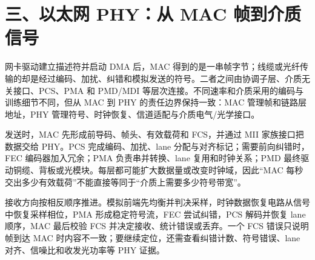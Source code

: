 \section{三、以太网 PHY：从 MAC 帧到介质信号}

网卡驱动建立描述符并启动 DMA 后，MAC 得到的是一串帧字节；线缆或光纤传输的却是经过编码、加扰、纠错和模拟发送的符号。二者之间由协调子层、介质无关接口、PCS、PMA 和 PMD/MDI 等层次连接。不同速率和介质采用的编码与训练细节不同，但从 MAC 到 PHY 的责任边界保持一致：MAC 管理帧和链路层地址，PHY 管理符号、时钟恢复、信道适配与介质电气/光学接口。\cite{ieee8023-baselines}

发送时，MAC 先形成前导码、帧头、有效载荷和 FCS，并通过 MII 家族接口把数据交给 PHY。PCS 完成编码、加扰、lane 分配与对齐标记；需要前向纠错时，FEC 编码器加入冗余；PMA 负责串并转换、lane 复用和时钟关系；PMD 最终驱动铜缆、背板或光模块。每层都可能扩大数据量或改变时钟域，因此“MAC 每秒交出多少有效载荷”不能直接等同于“介质上需要多少符号带宽”。

接收方向按相反顺序推进。模拟前端先均衡并判决采样，时钟数据恢复电路从信号中恢复采样相位，PMA 形成稳定符号流，FEC 尝试纠错，PCS 解码并恢复 lane 顺序，MAC 最后校验 FCS 并决定接收、统计错误或丢弃。一个 FCS 错误只说明帧到达 MAC 时内容不一致；要继续定位，还需查看纠错计数、符号错误、lane 对齐、信噪比和收发光功率等 PHY 证据。


